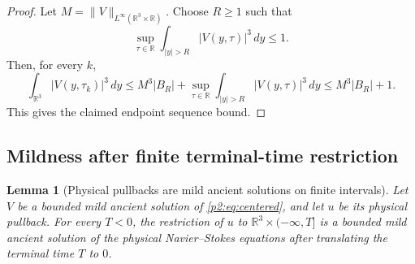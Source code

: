 \documentclass[11pt]{amsart}
\theoremstyle{plain}
\newtheorem{lemma}[lemma]{Lemma}
\theoremstyle{definition}
\theoremstyle{remark}
\numberwithin{equation}{section}
\newcommand{\R}{\mathbb R}
\begin{document}
\begin{proof}
Let \(M=\|V\|_{L^\infty(\R^3\times\R)}\).  Choose \(R\ge1\) such that
\[
   \sup_{\tau\in\R}\int_{|y|>R}|V(y,\tau)|^3\,dy\le1 .
\]
Then, for every \(k\),
\[
   \int_{\R^3}|V(y,\tau_k)|^3\,dy
   \le M^3 |B_R|
      + \sup_{\tau\in\R}\int_{|y|>R}|V(y,\tau)|^3\,dy
   \le M^3|B_R|+1 .
\]
This gives the claimed endpoint sequence bound.
\end{proof}

\subsection{Mildness after finite terminal-time restriction}

\begin{lemma}[Physical pullbacks are mild ancient solutions on finite intervals]
\label{p2:lem:physical-mild}
Let \(V\) be a bounded mild ancient solution of \eqref{p2:eq:centered}, and let
\(u\) be its physical pullback.  For every \(T<0\), the restriction of \(u\)
to \(\R^3\times(-\infty,T]\) is a bounded mild ancient solution of the
physical Navier--Stokes equations after translating the terminal time \(T\) to
\(0\).
\end{lemma}
\end{document}
